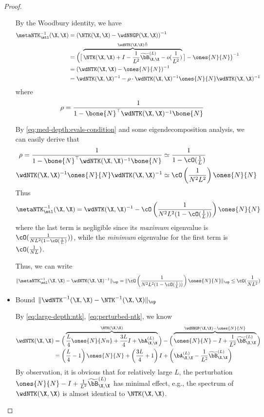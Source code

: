 \documentclass{article}
\begin{document}
\begin{proof}
\begin{itemize}
By the Woodbury identity, we have
\begin{align*}
    \metaNTK_\mtl^{-1}(\X,\X) 
    &= \left(\NTK(\X,\X) - \wdNNGP(\X,\X)\right)^{-1}\\
    &= \Big(\big[\overbrace{\NTK(\X,\X) + I - \frac{1}{L^2}  \widetilde{\bB}^{(L)}_{\X,\X} - o(\frac{1}{L^2})}^{\wdNTK(\X,\X) \triangleq }\big] - \ones{N}{N}\big)^{-1}\\
    &= \left(\wdNTK(\X,\X) - \ones{N}{N}\right)^{-1}\\
    &= \wdNTK(\X,\X)^{-1} - \rho \cdot \wdNTK(\X,\X)^{-1} \ones{N}{N} \wdNTK(\X,\X)^{-1}
\end{align*}
where $$\rho = \frac{1}{1 - \bone{N}^\top \wdNTK(\X,\X)^{-1} \bone{N} }$$

By \eqref{eq:med-depth:evals-condition} and some eigendecomposition analysis, we can easily derive that 
\begin{align*}
    \rho = \frac{1}{1 - \bone{N}^\top \wdNTK(\X,\X)^{-1} \bone{N} } &\simeq \frac{1}{1 - \cO(\frac{1}{L})}\\
    \wdNTK(\X,\X)^{-1} \ones{N}{N} \wdNTK(\X,\X)^{-1}&\simeq \cO\left(\frac{1}{N^2L^2}\right)\ones{N}{N} 
\end{align*}
Thus 
\begin{align}
    \metaNTK_\mtl^{-1}(\X,\X) = \wdNTK(\X,\X)^{-1} - \cO\left(\frac{1}{N^2L^2(1 - \cO(\frac{1}{L}))}\right)\ones{N}{N} 
\end{align}
where the last term is negligible since its \textit{maximum} eigenvalue is $\cO(\frac{1}{NL^2(1 - \cO(\frac{1}{L})}))$, while the \textit{minimum} eigenvalue for the first term is $\cO(\frac{1}{NL})$.

Thus, we can write
\begin{align}\label{eq:mtl-pertrbed-ntk:norm:bound}
    \|\metaNTK_\mtl^{-1}(\X,\X) - \wdNTK(\X,\X)^{-1}\|_{\op} = \|\cO\left(\frac{1}{N^2L^2(1 - \cO(\frac{1}{L}))}\right)\ones{N}{N} \|_{\op} \leq \cO(\frac{1}{NL^2})
\end{align}

\item Bound $\|\wdNTK^{-1}(\X,\X) - \NTK^{-1}(\X,\X)\|_{\op}$



By \eqref{eq:large-depth:ntk}, \eqref{eq:perturbed-ntk}, we know
\begin{align*}
    \wdNTK(\X,\X) &= \Big(\overbrace{ \frac{L}{4} \ones{N}{Nn} + \frac{3L}{4} I + \bA^{(L)}_{\X,\X} }^{\NTK(\X,\X)}\Big) - \Big(\overbrace{\ones{N}{N} - I + \frac{1}{L^2}  \widetilde{\bB}^{(L)}_{\X,\X}}^{\wdNNGP(\X,\X) - \ones{N}{N}}\Big) \\
    &= \left(\frac{L}{4} - 1\right)\ones{N}{N} + \left(\frac{3L}{4} + 1\right)I + \left(\bA^{(L)}_{\X,\X} - \frac{1}{L^2}  \widetilde{\bB}^{(L)}_{\X,\X}\right)
\end{align*}
By observation, it is obvious that for relatively large $L$, the perturbation $\ones{N}{N} - I + \frac{1}{L^2}  \widetilde{\bB}^{(L)}_{\X,\X}$ has minimal effect, e.g., the spectrum of $\wdNTK(\X,\X)$ is almost identical to $\NTK(\X,\X)$.


\end{itemize}
\end{proof}
\end{document}
